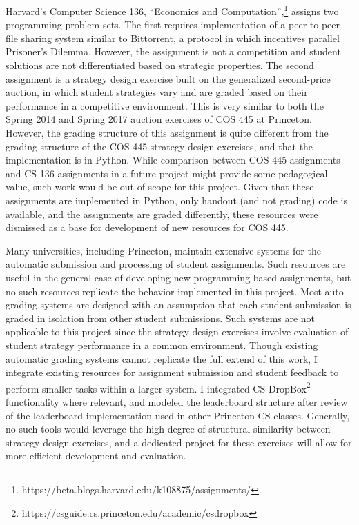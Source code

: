 \documentclass[pageno]{jpaper}
\begin{document}
Harvard's Computer Science 136, ``Economics and Computation'',\footnote{https://beta.blogs.harvard.edu/k108875/assignments/} assigns two programming problem sets.
The first requires implementation of a peer-to-peer file sharing system similar to Bittorrent, a protocol in which incentives parallel Prisoner's Dilemma.
However, the assignment is not a competition and student solutions are not differentiated based on strategic properties.
The second assignment is a strategy design exercise built on the generalized second-price auction, in which student strategies vary and are graded based on their performance in a competitive environment.
This is very similar to both the Spring 2014 and Spring 2017 auction exercises of COS 445 at Princeton.
However, the grading structure of this assignment is quite different from the grading structure of the COS 445 strategy design exercises, and that the implementation is in Python.
While comparison between COS 445 assignments and CS 136 assignments in a future project might provide some pedagogical value, such work would be out of scope for this project.
Given that these assignments are implemented in Python, only handout (and not grading) code is available, and the assignments are graded differently, these resources were dismissed as a base for development of new resources for COS 445.

Many universities, including Princeton, maintain extensive systems for the automatic submission and processing of student assignments.
Such resources are useful in the general case of developing new programming-based assignments, but no such resources replicate the behavior implemented in this project.
Most auto-grading systems are designed with an assumption that each student submission is graded in isolation from other student submissions.
Such systems are not applicable to this project since the strategy design exercises involve evaluation of student strategy performance in a common environment.
Though existing automatic grading systems cannot replicate the full extend of this work, I integrate existing resources for assignment submission and student feedback to perform smaller tasks within a larger system.
I integrated CS DropBox\footnote{https://csguide.cs.princeton.edu/academic/csdropbox} functionality where relevant, and modeled the leaderboard structure after review of the leaderboard implementation used in other Princeton CS classes.
Generally, no such tools would leverage the high degree of structural similarity between strategy design exercises, and a dedicated project for these exercises will allow for more efficient development and evaluation.
\end{document}
